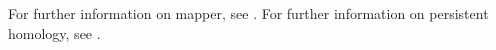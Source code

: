 
For further information on mapper, see \cite{Singh:2007}.
For further information on persistent homology, see \cite{Zomorodian:2005a,Zomorodian:2005b}.